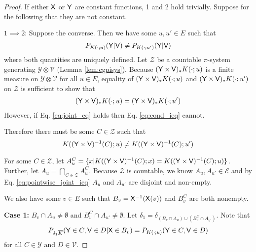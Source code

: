 \begin{proof}
If either $\mathsf{X}$ or $\mathsf{Y}$ are constant functions, 1 and 2 hold trivially. Suppose for the following that they are not constant.


$1\implies 2$:
Suppose the converse. Then we have some $u,u'\in E$ such that
\begin{align}
    P_{K(\cdot;u)}(\mathsf{Y}|\mathsf{V})\neq P_{K(\cdot;u')}(\mathsf{Y}|\mathsf{V})\label{eq:cond_ieq}
\end{align} 
where both quantities are uniquely defined. Let $\mathcal{Z}$ be a countable $\pi$-system generating $\mathcal{Y}\otimes \mathcal{V}$ (Lemma \ref{lem:cgpisys}). Because $(\mathsf{Y}\times\mathsf{V})_*K(\cdot;u)$ is a finite measure on $\mathcal{Y}\otimes \mathcal{V}$ for all $u\in E$, equality of $(\mathsf{Y}\times\mathsf{V})_*K(\cdot;u)$ and $(\mathsf{Y}\times\mathsf{V})_*K(\cdot;u')$ on $\mathcal{Z}$ is sufficient to show that 
\begin{align}
    (\mathsf{Y}\times\mathsf{V})_*K(\cdot;u)=(\mathsf{Y}\times\mathsf{V})_*K(\cdot;u')\label{eq:joint_eq}
\end{align} 
However, if Eq. \ref{eq:joint_eq} holds then Eq. \ref{eq:cond_ieq} cannot.

Therefore there must be some $C\in \mathcal{Z}$ such that 
\begin{align}
    K((\mathsf{Y}\times \mathsf{V})^{-1}(C);u)\neq K((\mathsf{Y}\times \mathsf{V})^{-1}(C);u')\label{eq:pointwise_joint_ieq}
\end{align}

For some $C\in\mathcal{Z}$, let $A^{C}_u=\{x|K((\mathsf{Y}\times\mathsf{V})^{-1}(C);x)=K((\mathsf{Y}\times\mathsf{V})^{-1}(C);u)\}$. Further, let $A_u=\bigcap_{C\in\mathcal{Z}} A^{C}_u$. Because $\mathcal{Z}$ is countable, we know $A_u, A_{u'}\in \mathcal{E}$ and by Eq. \ref{eq:pointwise_joint_ieq} $A_u$ and $A_{u'}$ are disjoint and non-empty.

We also have some $v\in E$ such that $B_v=\mathsf{X}^{-1}(\mathsf{X}(v))$ and $B_v^C$ are both nonempty.

\textbf{Case 1:} $B_v\cap A_u\neq \emptyset$ and $B_v^C \cap A_{u'}\neq \emptyset$. Let $\delta_1=\delta_{(B_v\cap A_u)\cup(B_v^C \cap A_{u'})}$. Note that
\begin{align}
    P_{\delta_1\overline{K}}(\mathsf{Y}\in C,\mathsf{V}\in D|\mathsf{X}\in B_v) &= P_{K(\cdot;u)}(\mathsf{Y}\in C,\mathsf{V}\in D)\\
\end{align}
for all $C\in \mathcal{Y}$ and $D\in \mathcal{V}$. 


\end{proof}
